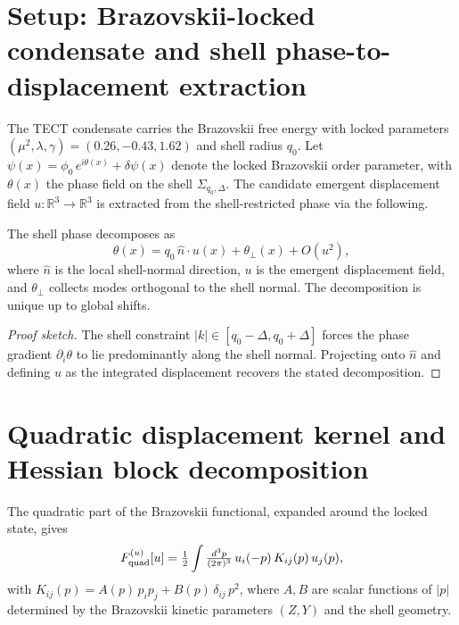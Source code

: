 \section{Setup: Brazovskii-locked condensate and shell
phase-to-displacement extraction}\label{sec:setup}

The TECT condensate carries the Brazovskii free energy with locked
parameters $(\mu^2, \lambda, \gamma) = (0.26, -0.43, 1.62)$ and shell
radius $q_0$. Let $\psi(x) = \phi_0\, e^{i\theta(x)} + \delta\psi(x)$
denote the locked Brazovskii order parameter, with $\theta(x)$ the
phase field on the shell $\Sigma_{q_0,\Delta}$. The candidate
emergent displacement field $u : \mathbb{R}^3 \to \mathbb{R}^3$ is
extracted from the shell-restricted phase via the following.

\begin{lemma}
\label{lem:displacement}
The shell phase decomposes as
\begin{equation}
\theta(x) = q_0\, \hat{n}\cdot u(x) + \theta_\perp(x) + O(u^2),
\end{equation}
where $\hat{n}$ is the local shell-normal direction, $u$ is the
emergent displacement field, and $\theta_\perp$ collects modes
orthogonal to the shell normal. The decomposition is unique up to
global shifts.
\end{lemma}

\begin{proof}[Proof sketch]
The shell constraint $|k| \in [q_0 - \Delta, q_0 + \Delta]$ forces
the phase gradient $\partial_i \theta$ to lie predominantly along
the shell normal. Projecting onto $\hat{n}$ and defining $u$ as the
integrated displacement recovers the stated decomposition.
\end{proof}

\section{Quadratic displacement kernel and Hessian block
decomposition}\label{sec:Hblocks}

\begin{definition}
The quadratic part of the Brazovskii functional, expanded around the
locked state, gives
\begin{equation}
F_{\rm quad}^{(u)}[u] = \tfrac{1}{2} \int \tfrac{d^3 p}{(2\pi)^3}\,
u_i(-p)\, K_{ij}(p)\, u_j(p),
\end{equation}
with $K_{ij}(p) = A(p)\, p_i p_j + B(p)\, \delta_{ij}\, p^2$, where
$A, B$ are scalar functions of $|p|$ determined by the Brazovskii
kinetic parameters $(Z, Y)$ and the shell geometry.
\end{definition}

